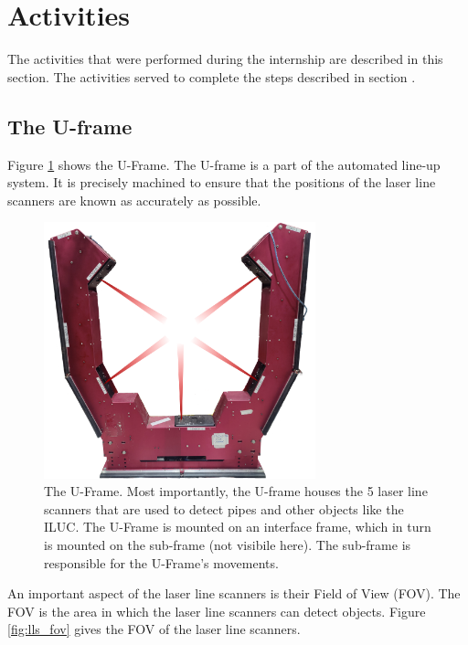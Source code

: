 \section{Activities} \label{sec:activities}
The activities that were performed during the internship are described in this section. The activities
served to complete the steps described in section .

\subsection{The U-frame} \label{ssec:U-frame}
Figure \ref{fig:U-frame} shows the U-Frame. The U-frame is a part of the automated line-up system. It is
precisely machined to ensure that the positions of the laser line scanners are known as accurately as possible.
\begin{figure}[H]
    \centering
    \includegraphics[width=0.7\textwidth]{images/u_frame_lasers.png}
    \caption{The U-Frame. Most importantly, the U-frame houses the 5 laser line scanners that are used to detect pipes and other
        objects like the ILUC. The U-Frame is mounted on an interface frame, which in turn is mounted on the sub-frame (not visibile here).
        The sub-frame is responsible for the U-Frame's movements.}
    \label{fig:U-frame}
\end{figure}
An important aspect of the laser line scanners is their Field of View (FOV).
The FOV is the area in which the laser line scanners can detect objects. Figure \ref{fig:lls_fov} gives the FOV
of the laser line scanners.
